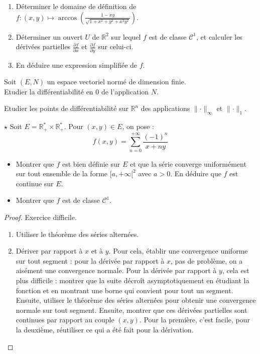 \documentclass[french,a4paper]{article}
\newcommand{\R}{\mathbb{R}}
\newcommand{\st}{^*}
\theoremstyle{plain}
\theoremstyle{definition}
\theoremstyle{remark}
\begin{document}
\begin{ex}[Moulin.03]{}
	\begin{enumerate}
		\item Déterminer le domaine de définition de $f:(x,y)\mapsto\displaystyle\arccos\left(\frac{1-xy}{\sqrt{1+x^2+y^2+x^2y^2}}\right)$.
		\item Déterminer un ouvert $U$ de $\R^2$ sur lequel $f$ est de classe $\mathcal{C}^1$, et calculer les dérivées partielles $\displaystyle\frac{\partial f}{\partial x}$ et $\displaystyle\frac{\partial f}{\partial y}$ sur celui-ci.
		\item En déduire une expression simplifiée de $f$.
	\end{enumerate}
\end{ex}

\begin{ex}[Moulin.04]{}
	Soit $(E,N)$ un espace vectoriel normé de dimension finie. \\
	Etudier la différentiabilité en $0$ de l'application $N$.
\end{ex}

\begin{ex}[Moulin.05]{}
	Etudier les points de différentiabilité sur $\R^n$ des applications $\lVert\cdot\rVert_\infty$ et $\lVert\cdot\rVert_1$.
\end{ex}

\begin{ex}[Moulin.06]{$\star$}
	Soit $E=\R_+\st\times\R_+\st$. Pour $(x,y)\in E$, on pose : $$f(x,y)=\sum_{n=0}^{+\infty}\frac{(-1)^n}{x+ny}$$
	\begin{itemize}
		\item Montrer que $f$ est bien définie sur $E$ et que la série converge uniformément sur tout ensemble de la forme $[a,+\infty[^2$ avec $a>0$. En déduire que $f$ est continue sur $E$.
		\item Montrer que $f$ est de classe $\mathcal{C}^1$.
	\end{itemize}
\end{ex}
\begin{proof}
	Exercice difficile.
	\begin{enumerate}
		\item Utiliser le théorème des séries alternées.
		\item Dériver par rapport à $x$ et à $y$. Pour cela, établir une convergence uniforme sur tout segment : pour la dérivée par rapport à $x$, pas de problème, on a aisément une convergence normale. Pour la dérivée par rapport à $y$, cela est plus difficile : montrer que la suite décroît asymptotiquement en étudiant la fonction et en montrant une borne qui convient pour tout un segment. Ensuite, utiliser le théorème des séries alternées pour obtenir une convergence normale sur tout segment. Ensuite, montrer que ces dérivées partielles sont continues par rapport au couple $(x,y)$. Pour la première, c'est facile, pour la deuxième, réutiliser ce qui a été fait pour la dérivation.
	\end{enumerate}
\end{proof}
\end{document}
